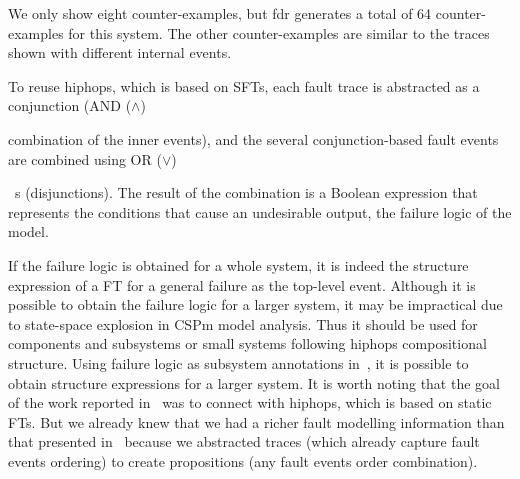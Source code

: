 \documentclass[en,twoside,onehalfspacing,phd]{risethesis}
\def\ortext{OR ($\lor$)%
  \gdef\ortext{OR\xspace}%
  \xspace
}
\def\andtext{AND ($\land$)%
  \gdef\andtext{AND\xspace}%
  \xspace
}
\begin{document}
We only show eight counter-examples, but \acs{fdr} generates a total of 64 counter-examples for this system.
The other counter-examples are similar to the traces shown with different internal events.

To reuse \ac{hiphops}, which is based on \acp{SFT}, each fault trace is abstracted as a conjunction (\andtext combination of the inner events), and the several conjunction-based fault events are combined using \ortext\ s (disjunctions).
%
The result of the combination is a Boolean expression that represents the conditions that cause an undesirable output, the failure logic of the model.

If the failure logic is obtained for a whole system, it is indeed the structure expression of a \acl{FT} for a general failure as the top-level event.
Although it is possible to obtain the failure logic for a larger system, it may be impractical due to state-space explosion in \ac{CSPm} model analysis.
Thus it should be used for components and subsystems or small systems following \ac{hiphops} compositional structure.
%
Using failure logic as subsystem annotations in~\cite{PMS+2001}, it is possible to obtain structure expressions for a larger system.
It is worth noting that the goal of the work reported in~\cite{DM2012} was to connect with \ac{hiphops}, which is based on static \aclp{FT}.
But we already knew that we had a richer fault modelling information than that presented in~\cite{DM2012} because we abstracted traces (which already capture fault events ordering) to create propositions (any fault events order combination).

\end{document}
